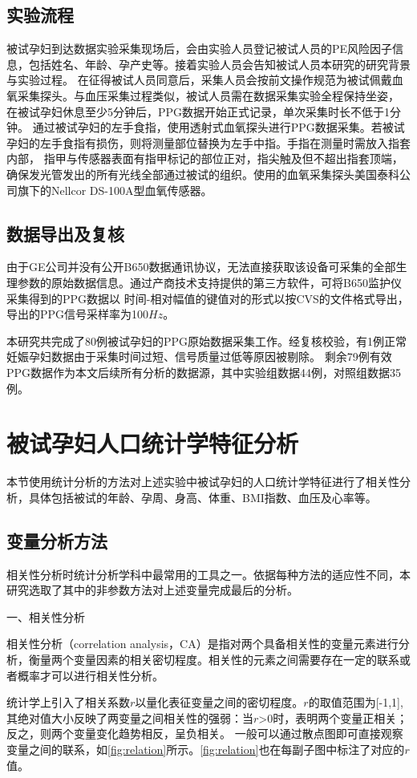 \subsection{实验流程}
被试孕妇到达数据实验采集现场后，会由实验人员登记被试人员的PE风险因子信息，包括姓名、年龄、孕产史等。接着实验人员会告知被试人员本研究的研究背景与实验过程。
在征得被试人员同意后，采集人员会按前文操作规范为被试佩戴血氧采集探头\cite{Chen2021}。与血压采集过程类似\cite{FIGO}，被试人员需在数据采集实验全程保持坐姿，
在被试孕妇休息至少5分钟后，PPG数据开始正式记录，单次采集时长不低于1分钟。
通过被试孕妇的左手食指，使用透射式血氧探头进行PPG数据采集。若被试孕妇的左手食指有损伤，则将测量部位替换为左手中指。手指在测量时需放入指套内部，
指甲与传感器表面有指甲标记的部位正对，指尖触及但不超出指套顶端，确保发光管发出的所有光线全部通过被试的组织。使用的血氧采集探头美国泰科公司旗下的Nellcor DS-100A型血氧传感器。 

\subsection{数据导出及复核}
由于GE公司并没有公开B650数据通讯协议，无法直接获取该设备可采集的全部生理参数的原始数据信息。通过产商技术支持提供的第三方软件，可将B650监护仪采集得到的PPG数据以
时间-相对幅值的键值对的形式以按CVS的文件格式导出，导出的PPG信号采样率为100$Hz$。

本研究共完成了80例被试孕妇的PPG原始数据采集工作。经复核校验，有1例正常妊娠孕妇数据由于采集时间过短、信号质量过低等原因被剔除。
剩余79例有效PPG数据作为本文后续所有分析的数据源，其中实验组数据44例，对照组数据35例。
\section{被试孕妇人口统计学特征分析}
本节使用统计分析的方法对上述实验中被试孕妇的人口统计学特征进行了相关性分析，具体包括被试的年龄、孕周、身高、体重、BMI指数、血压及心率等。
\subsection{变量分析方法}
相关性分析时统计分析学科中最常用的工具之一。依据每种方法的适应性不同，本研究选取了其中的非参数方法对上述变量完成最后的分析。

一、相关性分析

相关性分析（correlation analysis，CA）是指对两个具备相关性的变量元素进行分析，衡量两个变量因素的相关密切程度\cite{Zhang2019}。相关性的元素之间需要存在一定的联系或者概率才可以进行相关性分析。

统计学上引入了相关系数$r$以量化表征变量之间的密切程度。$r$的取值范围为[-1,1],其绝对值大小反映了两变量之间相关性的强弱：当$r$>0时，表明两个变量正相关；反之，则两个变量变化趋势相反，呈负相关。
一般可以通过散点图即可直接观察变量之间的联系，如\autoref{fig:relation}所示。\autoref{fig:relation}也在每副子图中标注了对应的$r$值。

